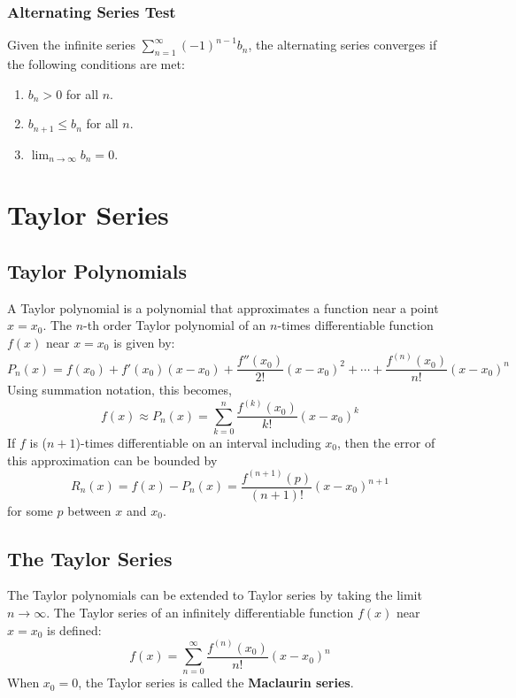 \documentclass{article}
\begin{document}
\subsubsection{Alternating Series Test}
Given the infinite series \(\sum_{n=1}^{\infty} {\left( -1
\right)}^{n-1} b_n\), the alternating series converges if the following
conditions are met:
\begin{enumerate}[label=(\arabic*)]
    \item \(b_n > 0\) for all \(n\).
    \item \(b_{n+1} \leqslant b_n\) for all \(n\).
    \item \(\lim_{n \to \infty} b_n = 0\).
\end{enumerate}
\section{Taylor Series}
\subsection{Taylor Polynomials}
A Taylor polynomial is a polynomial that approximates a function near a
point \(x = x_0\). The \(n\)-th order Taylor polynomial of an
\(n\)-times differentiable function \(f\left( x \right)\) near \(x =
x_0\) is given by:
\begin{equation*}
    P_n\left( x \right) = f\left( x_0 \right) + f'\left( x_0 \right) \left( x - x_0 \right) + \frac{f''\left( x_0 \right)}{2!} {\left( x - x_0 \right)}^2 + \cdots + \frac{f^{\left( n \right)}\left( x_0 \right)}{n!} {\left( x - x_0 \right)}^n
\end{equation*}
Using summation notation, this becomes,
\begin{equation*}
    f\left( x \right) \approx P_n\left( x \right) = \sum_{k=0}^{n} \frac{f^{\left( k \right)}\left( x_0 \right)}{k!} {\left( x - x_0 \right)}^k
\end{equation*}
If \(f\) is (\(n+1\))-times differentiable on an interval including
\(x_0\), then the error of this approximation can be bounded by
\begin{equation*}
    R_n\left( x \right) = f\left( x \right) - P_n\left( x \right) = \frac{f^{\left( n+1 \right)}\left( p \right)}{\left( n+1 \right)!} {\left( x - x_0 \right)}^{n+1}
\end{equation*}
for some \(p\) between \(x\) and \(x_0\).
\subsection{The Taylor Series}
The Taylor polynomials can be extended to Taylor series by taking the
limit \(n \to \infty\). The Taylor series of an infinitely
differentiable function \(f\left( x \right)\) near \(x = x_0\) is
defined:
\begin{equation*}
    f\left( x \right) = \sum_{n=0}^{\infty} \frac{f^{\left( n \right)}\left( x_0 \right)}{n!} {\left( x - x_0 \right)}^n
\end{equation*}
When \(x_0 = 0\), the Taylor series is called the \textbf{Maclaurin series}.
\end{document}
